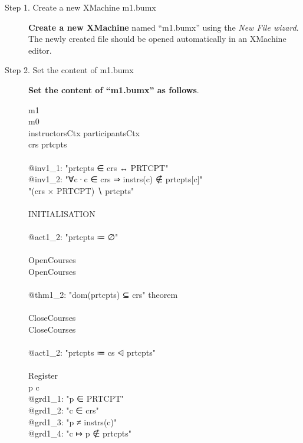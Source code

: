 \begin{description}
\item[Step 1. Create a new XMachine m1.bumx] \textbf{Create a new XMachine} named ``m1.bumx'' using the \emph{New File wizard}. The newly created file should be opened automatically in an XMachine editor.

\item[Step 2. Set the content of m1.bumx] \textbf{Set the content of ``m1.bumx'' as follows}.
  \begin{center}
    \begin{Bcode}
      \ifplastex
      \Bmachine{} m1\\
      \Brefines{} m0\\
      \Bsees{} instructorsCtx participantsCtx \\
      \Bvariables{} crs prtcpts \\
      \Binvariants\\
      @inv1_1: "prtcpts ∈ crs ↔ PRTCPT"\\
      @inv1_2: "∀c·c ∈ crs ⇒ instrs(c) ∉ prtcpts[{c}]"\\
      \Bvariant{} "(crs × PRTCPT) ∖ prtcpts"\\
      \Bevents\\
      INITIALISATION \Bextended\\
      \Bbegin\\
      @act1_2: "prtcpts ≔ ∅"\\
      \Bend\\
      OpenCourses \Bextended\\
      \Brefines{} OpenCourses\\
      \Bwhen\\
      @thm1_2: "dom(prtcpts) ⊆ crs" theorem \\
      \Bend\\
      CloseCourses \Bextended{} \Banticipated\\
      \Brefines{} CloseCourses\\
      \Bbegin\\
      @act1_2: "prtcpts ≔ cs ⩤ prtcpts"\\
      \Bend\\
      Register \Bconvergent\\
      \Bany{} p c \Bwhere \\
      @grd1_1: "p ∈ PRTCPT"\\
      @grd1_2: "c ∈ crs"\\
      @grd1_3: "p ≠ instrs(c)"\\
      @grd1_4: "c ↦ p ∉ prtcpts"\\

\end{Bcode}
\end{center}
\end{description}
